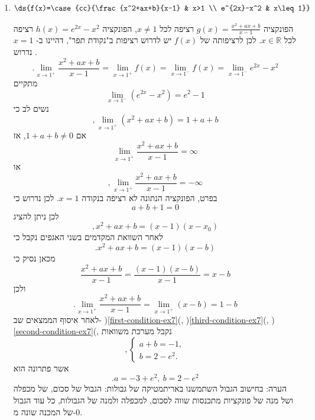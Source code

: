\begin{enumerate}
\item $$\ds{f(x)=\case{cc}{\frac{x^2+ax+b}{x-1} & x>1 \\ e^{2x}-x^2 & x\leq 1}}$$
\begin{solbox}
הפונקציה
$g(x)=\frac{x^2+ax+b}{x-1}$
רציפה לכל
$x\neq 1$,
הפונקציה
$h(x)=e^{2x}-x^2$
רציפה לכל
$x\in\mathbb{R}$.
לכן לרציפותה של
$f(x)$
יש לדרוש רציפות ב"נקודת תפר", דהיינו ב-
$x=1$.
נדרוש
$$.\lim_{x\to1^+}\frac{x^2+ax+b}{x-1}=\lim_{x\to1^+}f(x)=\lim_{x\to1^-}f(x)=\lim_{x\to1^-}e^{2x}-x^2$$
מתקיים
\begin{equation}\label{first-condition-ex7}
    \lim_{x\to1^-}(e^{2x}-x^2)=e^2-1
\end{equation}
נשים לב כי
$$,\lim_{x\to1^+}(x^2+ax+b)=1+a+b$$
אם
$1+a+b\neq 0$,
אז
$$\lim_{x\to1^+}\frac{x^2+ax+b}{x-1}=\infty$$
או
$$,\lim_{x\to1^+}\frac{x^2+ax+b}{x-1}=-\infty$$
בפרט,
הפונקציה הנתונה לא רציפה בנקודה
$x=1$.
לכן נדרוש כי
\begin{equation}\label{third-condition-ex7}
    a+b+1=0
\end{equation}
לכן
ניתן להציג
$$,x^2+ax+b=(x-1)(x-x_0)$$
לאחר השוואת המקדמים בשני האגפים נקבל כי
$$.x^2+ax+b=(x-1)(x-b)$$
מכאן נסיק כי
$$\frac{x^2+ax+b}{x-1}=\frac{(x-1)(x-b)}{x-1}=x-b$$
ולכן
\begin{equation}\label{second-condition-ex7}
    .\lim_{x\to1^+}\frac{x^2+ax+b}{x-1}=\lim_{x\to1^+}(x-b)=1-b
\end{equation}
לאחר איסוף הממצאים שב-
)\ref{first-condition-ex7}(, )\ref{third-condition-ex7}(, )\ref{second-condition-ex7}(,
נקבל מערכת משוואות
\[
,\begin{cases}
a+b=-1,\\
b=2-e^{2}.
\end{cases}
\]
אשר פתרונה הוא
$$.a=-3+e^2,\ b=2-e^2$$
הערה: בחישוב הגבול השתמשנו באריתמטיקה של גבולות: הגבול של סכום, של מכפלה ושל מנה של פונקציות מתכנסות שווה לסכום, למכפלה ולמנה של הגבולות, כל עוד הגבול של המכנה שונה מ-$0$.
\end{solbox}


\end{enumerate}
